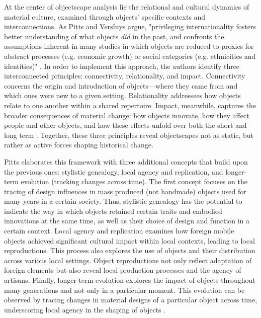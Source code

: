 At the center of objectscape analysis lie the relational and cultural dynamics of material culture, examined through objects' specific contexts and interconnections. As Pitts and Versluys argue, "privileging internationality fosters better understanding of what objects \textit{did} in the past, and confronts the assumptions inherent in many studies in which objects are reduced to proxies for abstract processes (e.g. economic growth) or social categories (e.g. ethnicities and identities)" \parencite[p.~368]{pittsObjectscapesManifestoInvestigating2021}. In order to implement this approach, the authors identify three interconnected principles: connectivity, relationality, and impact. Connectivity concerns the origin and introduction of objects---where they came from and which ones were new to a given setting. Relationality addressees how objects relate to one another within a shared repertoire. Impact, meanwhile, captures the broader consequences of material change: how objects innovate, how they affect people and other objects, and how these effects unfold over both the short and long term \parencite[p.~369-371]{pittsObjectscapesManifestoInvestigating2021}. Together, these three principles reveal objectscapes not as static, but rather as active forces shaping historical change.


Pitts elaborates this framework with three additional concepts that build upon the previous ones: stylistic genealogy, local agency and replication, and longer-term evolution (tracking changes across time). The first concept focuses on the tracing of design influences in mass produced (not handmade) objects used for many years in a certain society. Thus, stylistic genealogy has the potential to indicate the way in which objects retained certain traits and embodied innovations at the same time, as well as their choice of design and function in a certain context. Local agency and replication examines how foreign mobile objects achieved significant cultural impact within local contexts, leading to local reproductions. This process also explores the use of objects and their distribution across various local settings. Object reproductions not only reflect adaptation of foreign elements but also reveal local production processes and the agency of artisans. Finally, longer-term evolution explores the impact of objects throughout many generations and not only in a particular moment. This evolution can be observed by tracing changes in material designs of a particular object across time, underscoring local agency in the shaping of objects \parencites[p.~16-19]{pittsRomanObjectRevolution2019}.


